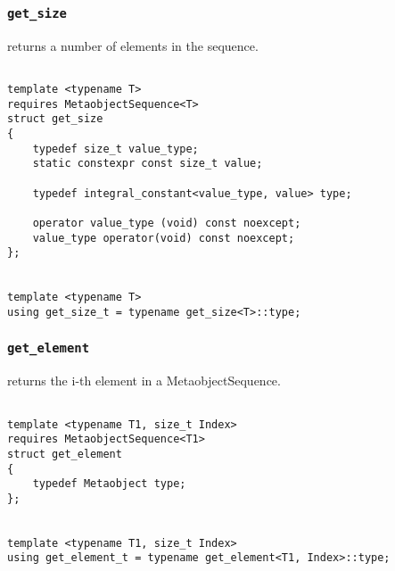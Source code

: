 
\subsubsection{\texttt{get\_size}}

returns a number of elements in the sequence.

\begin{verbatim}

template <typename T>
requires MetaobjectSequence<T>
struct get_size
{
	typedef size_t value_type;
	static constexpr const size_t value;

	typedef integral_constant<value_type, value> type;

	operator value_type (void) const noexcept;
	value_type operator(void) const noexcept;
};


template <typename T>
using get_size_t = typename get_size<T>::type;

\end{verbatim}

\subsubsection{\texttt{get\_element}}

returns the i-th element in a MetaobjectSequence.

\begin{verbatim}

template <typename T1, size_t Index>
requires MetaobjectSequence<T1>
struct get_element
{
	typedef Metaobject type;
};


template <typename T1, size_t Index>
using get_element_t = typename get_element<T1, Index>::type;

\end{verbatim}
